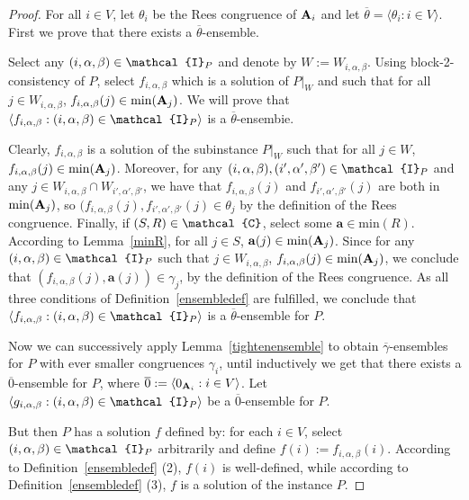 \documentclass[11pt]{amsart}
\newcommand{\m}[1]{{\uppercase {\mathbf {#1}}}}
\newcommand{\vr}[1]{{\uppercase {\mathcal{#1}}}}
\newcommand{\lb}{\langle}
\newcommand{\rb}{\rangle}
\theoremstyle{definition}
\begin{document}
\begin{proof}
For all $i\in V$, let $\theta_i$ be the Rees congruence of $\m a_i$ and let $\overline{\theta}=\lb \theta_i:i\in V\rb$. First we prove that there exists a $\overline{\theta}$-ensemble.

Select any $(i,\alpha,\beta)\in\vr i_P$ and denote by $W:=W_{i,\alpha,\beta}$. Using block-2-consistency of $P$, select $f_{i,\alpha,\beta}$ which is a solution of $P|_W$ and such that for all $j\in W_{i,\alpha,\beta}$, $f_{i,\alpha,\beta}(j)\in \mathrm{min}(\m a_j)$. We will prove that $\lb f_{i,\alpha,\beta}:(i,\alpha,\beta)\in \vr i_P\rb$ is a $\overline{\theta}$-ensembie.

Clearly, $f_{i,\alpha,\beta}$ is a solution of the subinstance $P|_{W}$ such that for all $j\in W$, $f_{i,\alpha,\beta}(j)\in \mathrm{min}(\m a_j)$. Moreover, for any $(i,\alpha,\beta),(i',\alpha',\beta')\in\vr i_P$ and any $j\in W_{i,\alpha,\beta}\cap W_{i',\alpha',\beta'}$, we have that $f_{i,\alpha,\beta}(j)$ and $f_{i',\alpha',\beta'}(j)$ are both in $\mathrm{min}(\m a_j)$, so $(f_{i,\alpha,\beta}(j),f_{i',\alpha',\beta'}(j)\in \theta_j$ by the definition of the Rees congruence. Finally, if $(S,R)\in \vr c$, select some $\mathbf{a}\in\mathrm{min}(R)$. According to Lemma~\ref{minR}, for all $j\in S$, $\mathbf{a}(j)\in\mathrm{min}(\m a_j)$. Since for any $(i,\alpha,\beta)\in\vr i_P$ such that $j\in W_{i,\alpha,\beta}$, $f_{i,\alpha,\beta}(j)\in \mathrm{min}(\m a_j)$, we conclude that $(f_{i,\alpha,\beta}(j),\mathbf{a}(j))\in\gamma_j$, by the definition of the Rees congruence. As all three conditions of Definition~\ref{ensembledef} are fulfilled, we conclude that $\lb f_{i,\alpha,\beta}:(i,\alpha,\beta)\in \vr i_P\rb$ is a $\overline{\theta}$-ensemble for $P$.

Now we can successively apply Lemma~\ref{tightenensemble} to obtain $\overline{\gamma}$-ensembles for $P$ with ever smaller congruences $\gamma_i$, until inductively we get that there exists a $\overline{0}$-ensemble for $P$, where $\overline{0}:=\lb 0_{\m a_i}:i\in V\rb$. Let $\lb g_{i,\alpha,\beta}:(i,\alpha,\beta)\in \vr i_P\rb$ be a $\overline{0}$-ensemble for $P$.

But then $P$ has a solution $f$ defined by: for each $i\in V$, select $(i,\alpha,\beta)\in \vr i_P$ arbitrarily and define $f(i):=f_{i,\alpha,\beta}(i)$. According to Definition~\ref{ensembledef} (2), $f(i)$ is well-defined, while according to Definition~\ref{ensembledef} (3), $f$ is a solution of the instance $P$.
\end{proof}
\end{document}
